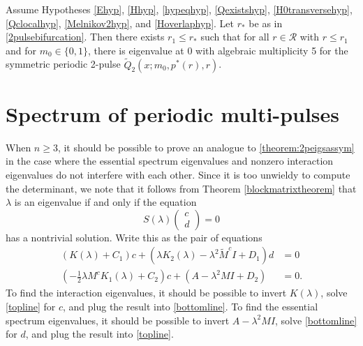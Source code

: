 \documentclass[thesis.tex]{subfiles}
\begin{document}
\begin{theorem}\label{theorem:2peigssym}
Assume Hypotheses \ref{Ehyp}, \ref{Hhyp}, \ref{hypeqhyp}, \ref{Qexistshyp}, \ref{H0transversehyp}, \ref{Qclocalhyp}, \ref{Melnikov2hyp}, and \ref{Hoverlaphyp}. Let $r_*$ be as in \cref{2pulsebifurcation}. Then there exists $r_1 \leq r_*$ such that for all $r \in \mathcal{R}$ with $r \leq r_1$ and for $m_0 \in \{0, 1\}$, there is eigenvalue at 0 with algebraic multiplicity 5 for the symmetric periodic 2-pulse $\tilde{Q}_2(x; m_0, p^*(r), r)$.
\end{theorem}

\iffulldocument\else
	
	
\fi

\section{Spectrum of periodic multi-pulses}

When $n \geq 3$, it should be possible to prove an analogue to \cref{theorem:2peigsassym} in the case where the essential spectrum eigenvalues and nonzero interaction eigenvalues do not interfere with each other. Since it is too unwieldy to compute the determinant, we note that it follows from Theorem \ref{blockmatrixtheorem} that $\lambda$ is an eigenvalue if and only if the equation
\[
S(\lambda) \begin{pmatrix} c\\d \end{pmatrix} = 0
\]
has a nontrivial solution. Write this as the pair of equations
\begin{align}
(K(\lambda) + C_1)c + (\lambda K_2(\lambda) - \lambda^2 \tilde{M}^c I + D_1)d &= 0 \label{topline} \\
(-\frac{1}{2} \lambda M^c K_1(\lambda) + C_2)c + (A - \lambda^2 MI + D_2) &= 0 \label{bottomline}.
\end{align}
To find the interaction eigenvalues, it should be possible to invert $K(\lambda)$, solve \cref{topline} for $c$, and plug the result into \cref{bottomline}. To find the essential spectrum eigenvalues, it should be possible to invert $A - \lambda^2 MI$, solve \cref{bottomline} for $d$, and plug the result into \cref{topline}.
\end{document}
